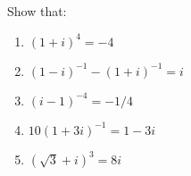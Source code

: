\documentclass{homework}
\date{Tuesday 1/29}
\author{}
\begin{document}
\begin{problem}[P.A.1]
  Show that:
  \begin{enumerate}
  \item \((1+i)^4 = -4\)

    \begin{solution}
    \end{solution}

  \item \((1-i)^{-1} - (1+i)^{-1} = i\)

    \begin{solution}
    \end{solution}

  \item \((i-1)^{-4} = -1/4\)

    \begin{solution}
    \end{solution}

  \item \(10 (1+3i)^{-1} = 1-3i\)

    \begin{solution}
    \end{solution}

  \item \((\sqrt 3 + i)^3 = 8i\)

    \begin{solution}
    \end{solution}

  \end{enumerate}
\end{problem}
\end{document}
